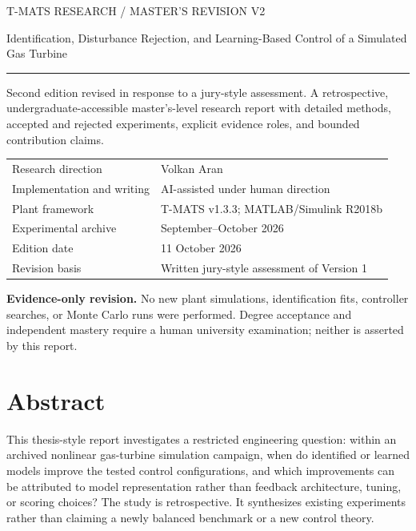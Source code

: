 \begin{titlepage}\sffamily\color{navy}
{\large T-MATS RESEARCH / MASTER'S REVISION V2}\par\vspace{12mm}
{\fontsize{27}{33}\selectfont\bfseries\raggedright{} Identification, Disturbance Rejection, and Learning-Based Control of a Simulated Gas Turbine\par}
\vspace{9mm}{\Large A comparative study of tracking, fuel-command reversal, and the limits of model-based improvement\par}
\vspace{8mm}\textcolor{teal}{\rule{\linewidth}{1.2pt}}\vspace{7mm}
\normalfont\color{black}
Second edition revised in response to a jury-style assessment. A retrospective, undergraduate-accessible master's-level research report with detailed methods, accepted and rejected experiments, explicit evidence roles, and bounded contribution claims.\par
\vspace{8mm}
\begin{tabular}{@{}ll@{}}
Research direction & Volkan Aran\\[5pt]
Implementation and writing & AI-assisted under human direction\\[5pt]
Plant framework & T-MATS v1.3.3; MATLAB/Simulink R2018b\\[5pt]
Experimental archive & September--October 2026\\[5pt]
Edition date & 11 October 2026\\[5pt]
Revision basis & Written jury-style assessment of Version 1
\end{tabular}
\vfill\textbf{Evidence-only revision.} No new plant simulations, identification fits, controller searches, or Monte Carlo runs were performed. Degree acceptance and independent mastery require a human university examination; neither is asserted by this report.
\end{titlepage}
\chapter*{Abstract}
This thesis-style report investigates a restricted engineering question: within an archived nonlinear gas-turbine simulation campaign, when do identified or learned models improve the tested control configurations, and which improvements can be attributed to model representation rather than feedback architecture, tuning, or scoring choices? The study is retrospective. It synthesizes existing experiments rather than claiming a newly balanced benchmark or a new control theory.

